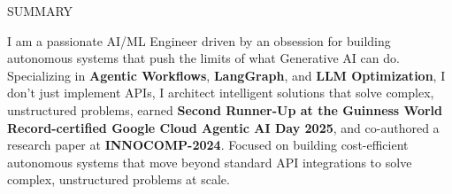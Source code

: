 \documentclass{resume} %
\begin{document}

\begin{rSection}{SUMMARY}

 I am a passionate AI/ML Engineer driven by an obsession for building autonomous systems that push the limits of what Generative AI can do. Specializing in \textbf{Agentic Workflows}, \textbf{LangGraph}, and \textbf{LLM Optimization}, I don't just implement APIs, I architect intelligent solutions that solve complex, unstructured problems, earned \textbf{Second Runner-Up at the Guinness World Record-certified Google Cloud Agentic AI Day 2025}, and co-authored a research paper at \textbf{INNOCOMP-2024}. Focused on building cost-efficient autonomous systems that move beyond standard API integrations to solve complex, unstructured problems at scale.

\end{rSection}

\end{document}
